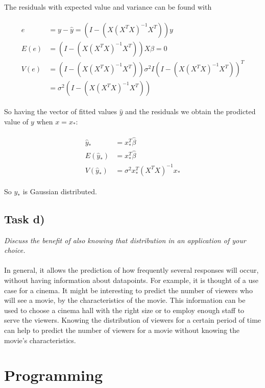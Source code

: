 \documentclass{article}
\begin{document}
The residuals with expected value and variance can be found with

\begin{align}
\begin{aligned}
e &= y - \hat y = (I - (X (X^TX)^{-1}X^T))y\\
E(e) &=(I - (X (X^TX)^{-1}X^T))X\beta = 0\\
V(e) &= (I - (X (X^TX)^{-1}X^T))\sigma^2 I (I - (X (X^TX)^{-1}X^T))^T \\
       &= \sigma^2(I - (X (X^TX)^{-1}X^T))
\end{aligned}
\end{align}

So having the vector of fitted values $\hat y$ and the residuals we obtain the prodicted value of $y$ when $x=x_*$:

\begin{align}
\begin{aligned}
\hat y_* &= x_*^T \hat\beta\\
E(\hat y_*) &= x_*^T\hat \beta\\
V(\hat y_*) &= \sigma^2 x_*^T (X^TX)^{-1}x_*
\end{aligned}
\end{align}

So $y_*$ is Gaussian distributed.

\subsection*{Task d)}
\textit{Discuss the benefit of also knowing that distribution in an application of your choice.}\\
\\
In general, it allows the prediction of how frequently several responses will occur, without having information about datapoints. For example, it is thought of a use case for a cinema. It might be interesting to predict the number of viewers who will see a movie, by the characteristics of the movie. This information can be used to choose a cinema hall with the right size or to employ enough staff to serve the viewers. Knowing the distribution of viewers for a certain period of time can help to predict the number of viewers for a movie without knowing the movie's characteristics.


\section{Programming}



%

%

\end{document}

